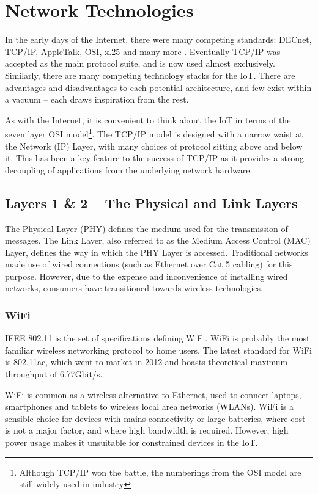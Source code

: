 \documentclass[10pt,journal,compsoc]{IEEEtran}
\begin{document}
\section{Network Technologies}
In the early days of the Internet, there were many competing standards: DECnet,
TCP/IP, AppleTalk, OSI, x.25 and many more \cite{Cerf1993}. Eventually TCP/IP
was accepted as the main protocol suite, and is now used almost exclusively.
Similarly, there are many competing technology stacks for the IoT. There are
advantages and disadvantages to each potential architecture, and few exist
within a vacuum -- each draws inspiration from the rest. 

As with the Internet, it is convenient to think about the IoT in terms of the
seven layer OSI model\footnote{Although TCP/IP won the battle, the numberings
from the OSI model are still widely used in industry}. The TCP/IP model is
designed with a narrow waist at the Network (IP) Layer, with many choices of
protocol sitting above and below it. This has been a key feature to the success
of TCP/IP as it provides a strong decoupling of applications from the
underlying network hardware.

\subsection{Layers 1 \& 2 -- The Physical and Link Layers}
\label{layer_1_2}
The Physical Layer (PHY) defines the medium used for the transmission of
messages. The Link Layer, also referred to as the Medium Access Control
(MAC) Layer, defines the way in which the PHY Layer is accessed. Traditional
networks made use of wired connections (such as Ethernet over Cat 5 cabling)
for this purpose. However, due to the expense and inconvenience of installing
wired networks, consumers have transitioned towards wireless technologies. 

\subsubsection{WiFi}
IEEE 802.11 is the set of specifications defining WiFi. WiFi is probably the
most familiar wireless networking protocol to home users. The latest standard
for WiFi is 802.11ac, which went to market in 2012 and boasts theoretical
maximum throughput of 6.77Gbit/s. 

WiFi is common as a wireless alternative to Ethernet, used to connect laptops,
smartphones and tablets to wireless local area networks (WLANs). WiFi is a
sensible choice for devices with mains connectivity or large batteries, where
cost is not a major factor, and where high bandwidth is required. However, high
power usage makes it unsuitable for constrained devices in the IoT.
\end{document}
